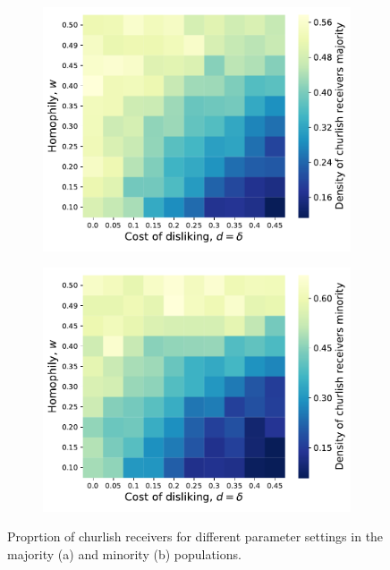 \documentclass[11pt,letterpaper]{article}
\begin{document}
\begin{figure}[H]
  \centering
  \begin{subfigure}{0.49\textwidth}
    \centering
    \includegraphics[width=\textwidth]{prelim/Figures/majority_receivers_025.pdf}
    \caption{}
    \label{fig:}
  \end{subfigure}
  \begin{subfigure}{0.49\textwidth}
    \centering
    \includegraphics[width=\textwidth]{prelim/Figures/minority_receivers_025.pdf}
    \caption{}
    \label{fig:}
  \end{subfigure}
  \caption{Proprtion of churlish receivers for different parameter settings in the
    majority (a) and minority (b) populations.}
  \label{fig:regressions}
\end{figure}
\end{document}
